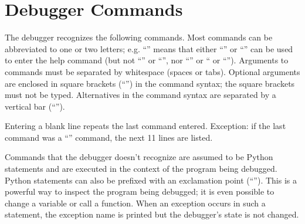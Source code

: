 \section{Debugger Commands}

The debugger recognizes the following commands.  Most commands can be
abbreviated to one or two letters; e.g. ``'' means that
either ``'' or ``'' can be used to enter the help
command (but not ``'' or ``'', nor ``'' or
`` or ``'').  Arguments to commands must be
separated by whitespace (spaces or tabs).  Optional arguments are
enclosed in square brackets (``\code{[]}'') in the command syntax; the
square brackets must not be typed.  Alternatives in the command syntax
are separated by a vertical bar (``\code{|}'').

Entering a blank line repeats the last command entered.  Exception: if
the last command was a ``'' command, the next 11 lines are
listed.

Commands that the debugger doesn't recognize are assumed to be Python
statements and are executed in the context of the program being
debugged.  Python statements can also be prefixed with an exclamation
point (``\code{!}'').  This is a powerful way to inspect the program
being debugged; it is even possible to change a variable or call a
function.  When an
exception occurs in such a statement, the exception name is printed
but the debugger's state is not changed.

